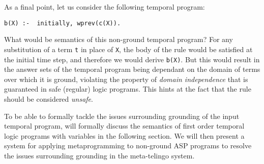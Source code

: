 As a final point, let us consider the following temporal program:

\begin{lstlisting}[language=clingo,numbers=none]
b(X) :-  initially, wprev(c(X)).
\end{lstlisting}

What would be semantics of this non-ground temporal program? For any
substitution of a term \verb|t| in place of \verb|X|, the body of the
rule would be satisfied at the initial time step, and therefore we
would derive \verb|b(X)|. But this would result in the answer sets of
the temporal program being dependant on the domain of terms over which
it is ground, violating the property of \textit{domain independence}
that is guaranteed in safe (regular) logic programs. This hints at the
fact that the rule should be considered \textit{unsafe}.

To be able to formally tackle the issues surrounding grounding of the
input temporal program, will formally discuss the semantics of first
order temporal logic programs with variables in the following
section. We will then present a system for applying metaprogramming to
non-ground ASP programs to resolve the issues surrounding grounding in
the meta-telingo system.
